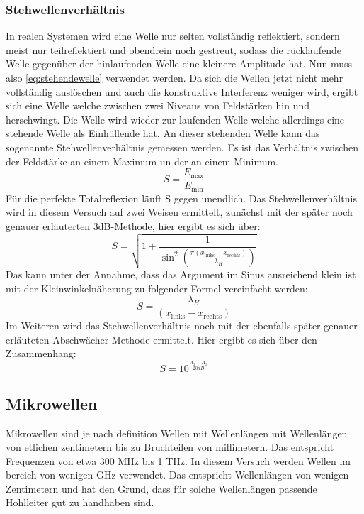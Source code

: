 \subsubsection{Stehwellenverhältnis}
\label{sec:thstehwelle}
In realen Systemen wird eine Welle nur selten vollständig reflektiert, sondern meist nur teilreflektiert
und obendrein noch gestreut, sodass die rücklaufende Welle gegenüber der hinlaufenden Welle eine
kleinere Amplitude hat. Nun muss also \autoref{eq:stehendewelle} verwendet werden. Da sich die Wellen 
jetzt nicht mehr vollständig auslöschen und auch die konstruktive Interferenz weniger wird, ergibt 
sich eine Welle welche zwischen zwei Niveaus von Feldstärken hin und herschwingt. Die Welle 
wird wieder zur laufenden Welle welche allerdings eine stehende Welle als Einhüllende hat.
An dieser stehenden Welle kann das sogenannte Stehwellenverhältnis gemessen werden. Es ist das 
Verhältnis zwischen der Feldstärke an einem Maximum un der an einem Minimum.
\begin{equation}
    \label{eq:stehwellenverhaeltnis}
    S=\frac{E_{\mathrm{max}}}{E_{\mathrm{min}}}
\end{equation}
Für die perfekte Totalreflexion läuft S gegen unendlich.
Das Stehwellenverhältnis wird in diesem Versuch auf zwei Weisen ermittelt, zunächst mit der
später noch genauer erläuterten 3dB-Methode, hier ergibt es sich über:
\begin{equation}
    \label{eq:dreidB}
    S=\sqrt{1+\frac{1}{\sin^2(\frac{\pi (x_{\mathrm{links}}-x_{\mathrm{rechts}})}{\lambda_H})}}
\end{equation}
Das kann unter der Annahme, dass das Argument im Sinus ausreichend klein ist mit der Kleinwinkelnäherung zu folgender
Formel vereinfacht werden:
\begin{equation}
    \label{eq:3dBleicht}
    S=\frac{\lambda_H}{(x_{\mathrm{links}}-x_{\mathrm{rechts}})}
\end{equation}
Im Weiteren wird das Stehwellenverhältnis noch mit der ebenfalls später genauer erläuteten Abschwächer 
Methode ermittelt. Hier ergibt es sich über den Zusammenhang:
\begin{equation}
    S=10^{\frac{A_2-A_1}{20dB}}
\end{equation}

\subsection{Mikrowellen}
\label{sec:thallgemein}
Mikrowellen sind je nach definition Wellen mit Wellenlängen mit Wellenlängen von etlichen zentimetern bis
zu Bruchteilen von millimetern. Das entspricht Frequenzen von etwa 300 MHz bis 1 THz. In diesem Versuch werden
Wellen im bereich von wenigen GHz verwendet. Das entspricht Wellenlängen von wenigen Zentimetern und hat den
Grund, dass für solche Wellenlängen passende Hohlleiter gut zu handhaben sind.

